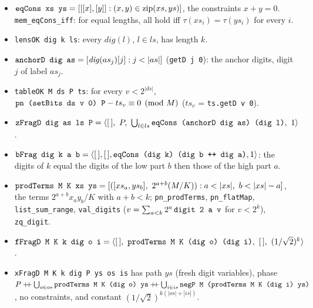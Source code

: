 \begin{definition}\label{def:lean-pathsum-fragD}
\begin{itemize}
\item $\textnormal{\texttt{eqCons xs ys}} = [[[x],[y]] : (x,y)\in\mathrm{zip}(xs,ys)]$, the constraints $x+y=0$.
  \textnormal{\texttt{mem\_\allowbreak{}eqCons\_\allowbreak{}iff}}: for equal lengths, all hold iff $\tau(xs_i) = \tau(ys_i)$ for every $i$.
\item \textnormal{\texttt{lensOK dig k ls}}: every $\mathit{dig}(l)$, $l\in ls$, has length $k$.
\item $\textnormal{\texttt{anchorD dig as}} = [\mathit{dig}(as_j)[j] : j<|as|]$ (\textnormal{\texttt{getD j 0}}): the anchor
  digits, digit $j$ of label $as_j$.
\item \textnormal{\texttt{tableOK M ds P ts}}: for every $v<2^{|ds|}$,
  $\textnormal{\texttt{pn (\allowbreak{}setBits ds v 0) P}} - ts_v \equiv 0\pmod M$ ($ts_v$ = \textnormal{\texttt{ts.\allowbreak{}getD v 0}}).
\item $\textnormal{\texttt{zFragD dig as ls P}} = \langle[\,],\ P,\ \bigcup_{l\in ls}\textnormal{\texttt{eqCons (\allowbreak{}anchorD dig as) (\allowbreak{}dig l)}},\ 1\rangle$.
\item $\textnormal{\texttt{bFrag dig k a b}} = \langle[\,],[\,],\textnormal{\texttt{eqCons (\allowbreak{}dig k) (\allowbreak{}dig b ++ dig a)}},1\rangle$: the
  digits of $k$ equal the digits of the low part $b$ then those of the high part $a$.
\item $\textnormal{\texttt{prodTerms M K xs ys}} = [([xs_a, ys_b],\ 2^{a+b}(M/K)) : a<|xs|,\ b<|xs|-a]$, the terms
  $2^{a+b}x_ay_b/K$ with $a+b<k$; \textnormal{\texttt{pn\_\allowbreak{}prodTerms}}, \textnormal{\texttt{pn\_\allowbreak{}flatMap}}, \textnormal{\texttt{list\_\allowbreak{}sum\_\allowbreak{}range}},
  \textnormal{\texttt{val\_\allowbreak{}digits}} ($v = \sum_{a<k}2^a\,\textnormal{\texttt{digit 2 a v}}$ for $v<2^k$), \textnormal{\texttt{zq\_\allowbreak{}digit}}.
\item $\textnormal{\texttt{fFragD M K k dig o i}} = \langle[\,],\ \textnormal{\texttt{prodTerms M K (\allowbreak{}dig o) (\allowbreak{}dig i)}},\ [\,],\ (1/\sqrt2)^k\rangle$.
\item \textnormal{\texttt{xFragD M K k dig P ys os is}} has path $ys$ (fresh digit variables), phase
  $P\mathbin{+\!\!+}\bigcup_{o\in os}\textnormal{\texttt{prodTerms M K (\allowbreak{}dig o) ys}}\mathbin{+\!\!+}\bigcup_{i\in is}\textnormal{\texttt{negP M (\allowbreak{}prodTerms M K (\allowbreak{}dig i) ys)}}$,
  no constraints, and constant $(1/\sqrt2)^{k(|os|+|is|)}$.
\end{itemize}
\end{definition}

